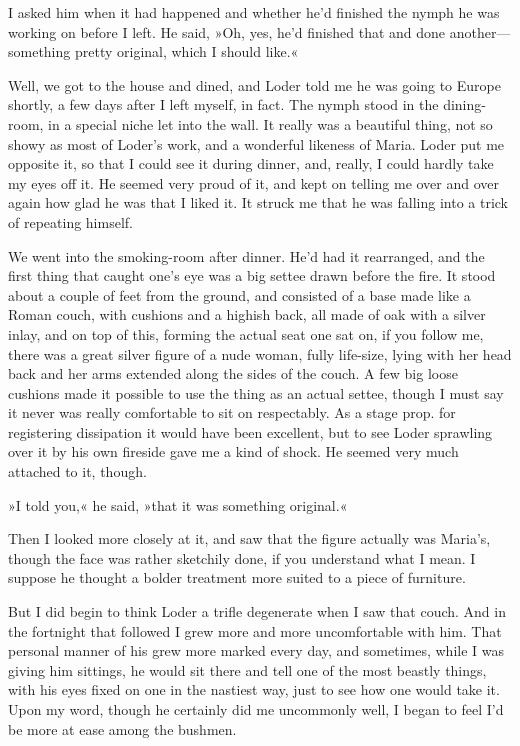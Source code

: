 I asked him when it had happened and whether he'd finished the nymph he was working on before I left. He said, »Oh, yes, he'd finished that and done another—something pretty original, which I should like.«

Well, we got to the house and dined, and Loder told me he was going to Europe shortly, a few days after I left myself, in fact. The nymph stood in the dining-room, in a special niche let into the wall. It really was a beautiful thing, not so showy as most of Loder's work, and a wonderful likeness of Maria. Loder put me opposite it, so that I could see it during dinner, and, really, I could hardly take my eyes off it. He seemed very proud of it, and kept on telling me over and over again how glad he was that I liked it. It struck me that he was falling into a trick of repeating himself.

We went into the smoking-room after dinner. He'd had it rearranged, and the first thing that caught one's eye was a big settee drawn before the fire. It stood about a couple of feet from the ground, and consisted of a base made like a Roman couch, with cushions and a highish back, all made of oak with a silver inlay, and on top of this, forming the actual seat one sat on, if you follow me, there was a great silver figure of a nude woman, fully life-size, lying with her head back and her arms extended along the sides of the couch. A few big loose cushions made it possible to use the thing as an actual settee, though I must say it never was really comfortable to sit on respectably. As a stage prop. for registering dissipation it would have been excellent, but to see Loder sprawling over it by his own fireside gave me a kind of shock. He seemed very much attached to it, though.

»I told you,« he said, »that it was something original.«

Then I looked more closely at it, and saw that the figure actually was Maria's, though the face was rather sketchily done, if you understand what I mean. I suppose he thought a bolder treatment more suited to a piece of furniture.

But I did begin to think Loder a trifle degenerate when I saw that couch. And in the fortnight that followed I grew more and more uncomfortable with him. That personal manner of his grew more marked every day, and sometimes, while I was giving him sittings, he would sit there and tell one of the most beastly things, with his eyes fixed on one in the nastiest way, just to see how one would take it. Upon my word, though he certainly did me uncommonly well, I began to feel I'd be more at ease among the bushmen.

